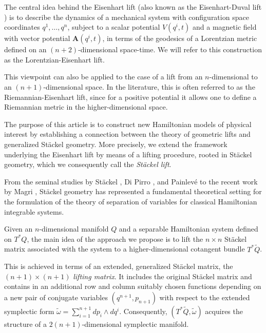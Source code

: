 \documentclass[10pt]{amsart}
\numberwithin{equation}{section}
\newcommand{\bs}{\boldsymbol}
\theoremstyle{definition}
\begin{document}
	The central idea behind the Eisenhart lift (also known as the Eisenhart-Duval lift \cite{DBKP1985PRD,DGH1991PRD}) is to
	describe the dynamics of a mechanical system with configuration space coordinates $q^1,\ldots,q^n$, subject to a scalar potential $V(q^i,t)$ and a magnetic field with vector potential $\bs{A}(q^i,t)$, in terms of the geodesics of a Lorentzian metric defined on an $(n+2)$-dimensional space-time. We will refer to this construction as the Lorentzian-Eisenhart lift. 
	
	
	
	This viewpoint can also be applied to the case of a lift from an $n$-dimensional to an $(n+1)$-dimensional space. In the literature, this is often referred to as the Riemannian-Eisenhart lift, since for a positive potential it allows one to define a Riemannian metric in the higher-dimensional space.
	
	\vspace{2mm}
	
	The purpose of this article is to construct new Hamiltonian models of physical interest by establishing a connection between  the theory of geometric lifts and generalized St\"ackel geometry. More precisely,  we extend the framework underlying the Eisenhart lift by means of a lifting procedure, rooted in St\"ackel geometry, which we consequently call the \textit{St\"ackel lift}.

From the seminal studies by St\"ackel \cite{St1893CRAS,St1897AMPA}, Di Pirro \cite{DPAMPA1896}, and Painlev\'e \cite{PainlCRAS1897} to the recent work by Magri \cite{MPhysD2023}, St\"ackel geometry has represented a fundamental theoretical setting for the formulation of the theory of separation of variables for classical Hamiltonian integrable systems.
	
	
	Given an $n$-dimensional manifold $Q$ and a  separable Hamiltonian system defined on $T^{*}Q$, the main idea of the approach we propose is to lift the $n\times n$ St\"ackel matrix associated with the system to a higher-dimensional cotangent bundle $T^{*}\tilde{Q}$.

	
	
	This is achieved in terms of an extended, generalized St\"ackel matrix, the $(n+1)\times (n+1)$ \textit{lifting matrix}. It includes the original St\"ackel matrix and contains  in an additional row and column suitably chosen functions depending on a new pair of conjugate variables $(q^{n+1}, p_{n+1})$  with respect to the extended symplectic form $\tilde{\omega}= \sum_{i=1}^{n+1} dp_i \wedge dq^{i}$. Consequently, $(T^{*}\tilde{Q}, \tilde{\omega})$ acquires the structure of a $2(n+1)$-dimensional symplectic manifold.
	
\end{document}
